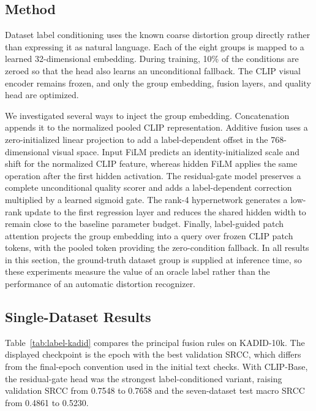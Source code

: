 \documentclass{article}
\begin{document}
\subsection{Method}

Dataset label conditioning uses the known coarse distortion group directly rather than expressing it as natural language. Each of the eight groups is mapped to a learned 32-dimensional embedding. During training, 10\% of the conditions are zeroed so that the head also learns an unconditional fallback. The CLIP visual encoder remains frozen, and only the group embedding, fusion layers, and quality head are optimized.

We investigated several ways to inject the group embedding. Concatenation appends it to the normalized pooled CLIP representation. Additive fusion uses a zero-initialized linear projection to add a label-dependent offset in the 768-dimensional visual space. Input FiLM predicts an identity-initialized scale and shift for the normalized CLIP feature, whereas hidden FiLM applies the same operation after the first hidden activation. The residual-gate model preserves a complete unconditional quality scorer and adds a label-dependent correction multiplied by a learned sigmoid gate. The rank-4 hypernetwork generates a low-rank update to the first regression layer and reduces the shared hidden width to remain close to the baseline parameter budget. Finally, label-guided patch attention projects the group embedding into a query over frozen CLIP patch tokens, with the pooled token providing the zero-condition fallback. In all results in this section, the ground-truth dataset group is supplied at inference time, so these experiments measure the value of an oracle label rather than the performance of an automatic distortion recognizer.

\subsection{Single-Dataset Results}

Table~\ref{tab:label-kadid} compares the principal fusion rules on KADID-10k. The displayed checkpoint is the epoch with the best validation SRCC, which differs from the final-epoch convention used in the initial text checks. With CLIP-Base, the residual-gate head was the strongest label-conditioned variant, raising validation SRCC from 0.7548 to 0.7658 and the seven-dataset test macro SRCC from 0.4861 to 0.5230.
\end{document}
